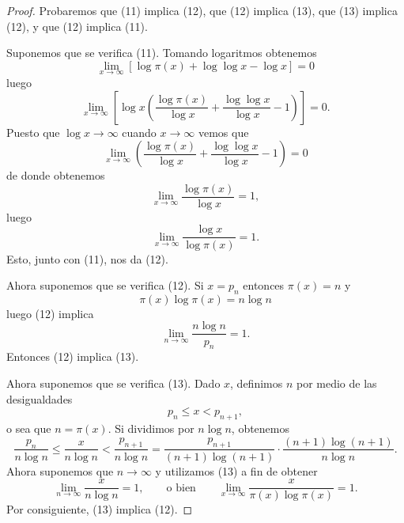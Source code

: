 \documentclass[12pt,a4paper]{book}
\begin{document}
    \begin{proof}
        Probaremos que (11) implica (12), que (12) implica (13), que (13) implica
        (12), y que (12) implica (11).

        Suponemos que se verifica (11). Tomando logaritmos obtenemos
        \begin{equation*}
            \lim_{x\to\infty}\left[\log\pi(x)+\log\log x-\log x\right]=0
        \end{equation*}
        luego
        \begin{equation*}
            \lim_{x\to\infty}\left[\log x\left(\frac{\log\pi(x)}{\log x}
            +\frac{\log\log x}{\log x}-1\right)\right]=0.
        \end{equation*}
        Puesto que $\log x\to\infty$ cuando $x\to\infty$ vemos que
        \begin{equation*}
            \lim_{x\to\infty}\left(\frac{\log\pi(x)}{\log x}+\frac{\log\log x}{\log x}-1\right)=0
        \end{equation*}
        de donde obtenemos
        \begin{equation*}
            \lim_{x\to\infty}\frac{\log\pi(x)}{\log x}=1,
        \end{equation*}
        luego
        \begin{equation*}
            \lim_{x\to\infty}\frac{\log x}{\log\pi(x)}=1.
        \end{equation*}
        Esto, junto con (11), nos da (12).

        Ahora suponemos que se verifica (12). Si $x=p_n$ entonces $\pi(x)=n$ y
        \begin{equation*}
            \pi(x)\log\pi(x)=n\log n
        \end{equation*}
        luego (12) implica
        \begin{equation*}
            \lim_{n\to\infty}\frac{n\log n}{p_n}=1.
        \end{equation*}
        Entonces (12) implica (13).

        Ahora suponemos que se verifica (13). Dado $x$, definimos $n$ por medio de las
        desigualdades
        \begin{equation*}
            p_n\leq x<p_{n+1},
        \end{equation*}
        o sea que $n=\pi(x)$. Si dividimos por $n\log n$, obtenemos
        \begin{equation*}
            \frac{p_n}{n\log n}\leq\frac{x}{n\log n}<\frac{p_{n+1}}{n\log n}
            =\frac{p_{n+1}}{(n+1)\log(n+1)}\cdot\frac{(n+1)\log(n+1)}{n\log n}.
        \end{equation*}
        Ahora suponemos que $n\to\infty$ y utilizamos (13) a fin de obtener
        \begin{equation*}
            \lim_{n\to\infty}\frac{x}{n\log n}=1,\qquad\text{o bien}\qquad
            \lim_{x\to\infty}\frac{x}{\pi(x)\log\pi(x)}=1.
        \end{equation*}
        Por consiguiente, (13) implica (12).


\end{proof}
\end{document}
